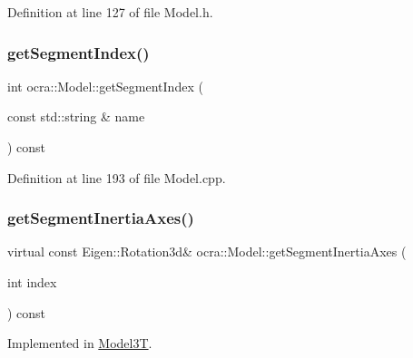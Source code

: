 Definition at line 127 of file Model.\+h.

\hypertarget{classocra_1_1Model_a0043ea00ff58fc52bc2d8f54d5fb5400}{}\label{classocra_1_1Model_a0043ea00ff58fc52bc2d8f54d5fb5400} 
\subsubsection{\texorpdfstring{get\+Segment\+Index()}{getSegmentIndex()}}
{\footnotesize\ttfamily int ocra\+::\+Model\+::get\+Segment\+Index (\begin{DoxyParamCaption}\item[{const std\+::string \&}]{name }\end{DoxyParamCaption}) const}



Definition at line 193 of file Model.\+cpp.

\hypertarget{classocra_1_1Model_a09d58bf429940098baf9727140e37441}{}\label{classocra_1_1Model_a09d58bf429940098baf9727140e37441} 
\subsubsection{\texorpdfstring{get\+Segment\+Inertia\+Axes()}{getSegmentInertiaAxes()}\hspace{0.1cm}{\footnotesize\ttfamily [1/2]}}
{\footnotesize\ttfamily virtual const Eigen\+::\+Rotation3d\& ocra\+::\+Model\+::get\+Segment\+Inertia\+Axes (\begin{DoxyParamCaption}\item[{int}]{index }\end{DoxyParamCaption}) const\hspace{0.3cm}{\ttfamily [pure virtual]}}



Implemented in \hyperlink{classModel3T_a40cf731f4ab38620127021aaa68d387a}{Model3T}.

\hypertarget{classocra_1_1Model_a44c8d343bd71f82c9736c40b0e241449}{}\label{classocra_1_1Model_a44c8d343bd71f82c9736c40b0e241449} 
